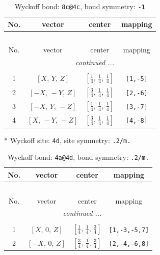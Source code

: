 \documentclass[fleqn,8pt]{jsarticle}
\begin{document}
\begin{longtable}{cccc}
\caption{Wyckoff bond: {\tt 8c@4c}, bond symmetry: {\tt -1}}
 \\
 \hline \hline
No. & vector & center & mapping \\ \hline \endfirsthead

\multicolumn{3}{l}{\tablename\ \thetable{}} \\
 \hline \hline
No. & vector & center & mapping \\ \hline \endhead

 \hline \hline
\multicolumn{3}{r}{\footnotesize\it continued ...} \\ \endfoot

 \hline \hline
\multicolumn{3}{r}{} \\ \endlastfoot

1 & $\left[ X,\, Y,\, Z \right]$ & $\left[ \frac{1}{4},\, \frac{1}{4},\, \frac{1}{4} \right]$ & {\tt [1,-5]} \\ \hline
2 & $\left[ - X,\, - Y,\, Z \right]$ & $\left[ \frac{3}{4},\, \frac{1}{4},\, \frac{1}{4} \right]$ & {\tt [2,-6]} \\ \hline
3 & $\left[ - X,\, Y,\, - Z \right]$ & $\left[ \frac{1}{4},\, \frac{1}{4},\, \frac{1}{4} \right]$ & {\tt [3,-7]} \\ \hline
4 & $\left[ X,\, - Y,\, - Z \right]$ & $\left[ \frac{3}{4},\, \frac{1}{4},\, \frac{1}{4} \right]$ & {\tt [4,-8]} \\
\end{longtable}
* Wyckoff site: {\tt 4d}, site symmetry: {\tt .2/m.}
\renewcommand{\arraystretch}{1.2}
\begin{longtable}{cccc}
\caption{Wyckoff bond: {\tt 4a@4d}, bond symmetry: {\tt .2/m.}}
 \\
 \hline \hline
No. & vector & center & mapping \\ \hline \endfirsthead

\multicolumn{3}{l}{\tablename\ \thetable{}} \\
 \hline \hline
No. & vector & center & mapping \\ \hline \endhead

 \hline \hline
\multicolumn{3}{r}{\footnotesize\it continued ...} \\ \endfoot

 \hline \hline
\multicolumn{3}{r}{} \\ \endlastfoot

1 & $\left[ X,\, 0,\, Z \right]$ & $\left[ \frac{1}{4},\, \frac{1}{4},\, \frac{3}{4} \right]$ & {\tt [1,-3,-5,7]} \\ \hline
2 & $\left[ - X,\, 0,\, Z \right]$ & $\left[ \frac{3}{4},\, \frac{1}{4},\, \frac{3}{4} \right]$ & {\tt [2,-4,-6,8]} \\
\end{longtable}
\end{document}
